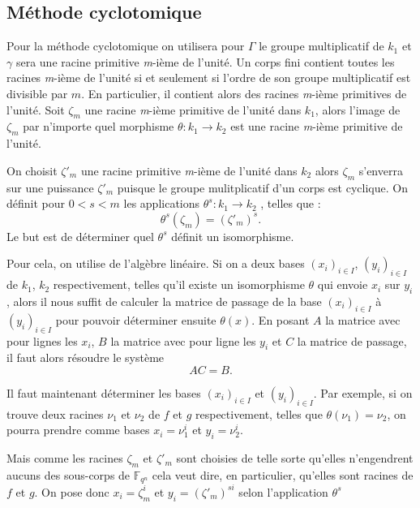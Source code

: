 \documentclass[a4paper]{article} %
\numberwithin{section}{part}
\numberwithin{equation}{section}
\newcommand\nroot[1]{\textit{#1}-ième}
\newcommand\GF[1]{\mathbb{F}_{#1}}
\begin{document}
\subsection{Méthode cyclotomique}
Pour la méthode cyclotomique on utilisera pour $\Gamma$ le groupe multiplicatif 
de $k_1$ et $\gamma$ sera une racine primitive \nroot{m} de l'unité.
Un corps fini contient toutes les racines \nroot{m} de l'unité si et seulement 
si l'ordre de son groupe multiplicatif est divisible par $m$. En particulier, il
contient alors des racines \nroot{m} primitives de l'unité. Soit $\zeta_m$ une
racine \nroot{m} primitive de l'unité dans $k_1$, alors l'image de $\zeta_m$ par
n'importe quel morphisme $\theta : k_1 \to k_2$ est une racine \nroot{m} 
primitive de l'unité.\par
On choisit $\zeta'_m$ une racine primitive \nroot{m} de l'unité dans $k_2$
alors $\zeta_m$ s'enverra sur une puissance $\zeta'_m$ puisque le groupe 
mulitplicatif d'un corps est cyclique. On définit pour $0 < s < m$ les
applications $\theta^s : k_1 \to k_2$ , telles que :
\begin{equation}
\theta^s(\zeta_m) = (\zeta'_m)^s.
\end{equation}
Le but est de déterminer quel $\theta^s$ définit un isomorphisme.\par
Pour cela, on utilise de l'algèbre linéaire. Si on a deux bases 
$(x_i)_{i\in I}$, $(y_i)_{i\in I}$ de $k_1$, $k_2$ respectivement, telles 
qu'il existe un isomorphisme $\theta$ qui envoie $x_i$ sur $y_i$, alors il nous
suffit de calculer la matrice de passage de la base $(x_i)_{i\in I}$ à
$(y_i)_{i\in I}$ pour pouvoir déterminer ensuite $\theta(x)$. En posant $A$ la
matrice avec pour lignes les $x_i$, $B$ la matrice avec pour ligne les $y_i$ et
$C$ la matrice de passage, il faut alors résoudre le système 
\begin{equation}
AC = B.
\end{equation}
\par
Il faut maintenant déterminer les bases $(x_i)_{i\in I}$ et $(y_i)_{i\in I}$. 
Par exemple, si on trouve deux racines $\nu_1$ et $\nu_2$ de $f$ et $g$ 
respectivement, telles que $\theta(\nu_1) = \nu_2$, on pourra prendre comme 
bases $x_i = \nu_1^i$ et $y_i = \nu_2^i$.\par
Mais comme les racines $\zeta_m$ et $\zeta'_m$ sont choisies de telle sorte 
qu'elles n'engendrent aucuns des sous-corps de $\GF{q^n}$ cela veut 
dire, en particulier, qu'elles sont racines de $f$ et $g$. On pose donc 
$x_i = \zeta_m^i$ et $y_i = (\zeta'_m)^{si}$ selon l'application $\theta^s$ 
\end{document}
